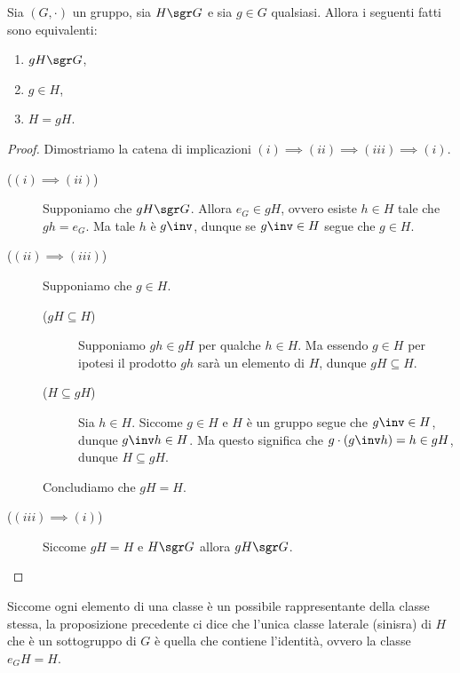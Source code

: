 \begin{proposition}\label{prop:cond_laterale_è_sgrp}
    Sia $(G, \cdot)$ un gruppo, sia $H \sgr G$ e sia $g \in G$ qualsiasi. Allora i seguenti fatti sono equivalenti:
    \begin{enumerate}[label={(\roman*)}]
        \item $gH \sgr G$,
        \item $g \in H$,
        \item $H = gH$.
    \end{enumerate}
\end{proposition}
\begin{proof}
    Dimostriamo la catena di implicazioni $(i) \implies (ii) \implies (iii) \implies (i)$.
    \begin{description}
        \item[($(i) \implies (ii)$)] Supponiamo che $gH \sgr G$. Allora $e_G \in gH$, ovvero esiste $h \in H$ tale che $gh = e_G$. Ma tale $h$ è $g\inv$, dunque se $g\inv \in H$ segue che $g \in H$.
        \item[($(ii) \implies (iii)$)] Supponiamo che $g \in H$. 
        \begin{description}
            \item[($gH \subseteq H$)] Supponiamo $gh \in gH$ per qualche $h \in H$. Ma essendo $g \in H$ per ipotesi il prodotto $gh$ sarà un elemento di $H$, dunque $gH \subseteq H$.
            \item[($H \subseteq gH$)] Sia $h \in H$. Siccome $g \in H$ e $H$ è un gruppo segue che $g\inv \in H$, dunque $g\inv h \in H$. Ma questo significa che $g\cdot(g\inv h) = h \in gH$, dunque $H \subseteq gH$.
        \end{description}
        Concludiamo che $gH = H$.
        \item[($(iii) \implies (i)$)] Siccome $gH = H$ e $H \sgr G$ allora $gH \sgr G$. \qedhere 
    \end{description}
\end{proof}

Siccome ogni elemento di una classe è un possibile rappresentante della classe stessa, la proposizione precedente ci dice che l'unica classe laterale (sinisra) di $H$ che è un sottogruppo di $G$ è quella che contiene l'identità, ovvero la classe $e_GH = H$.

